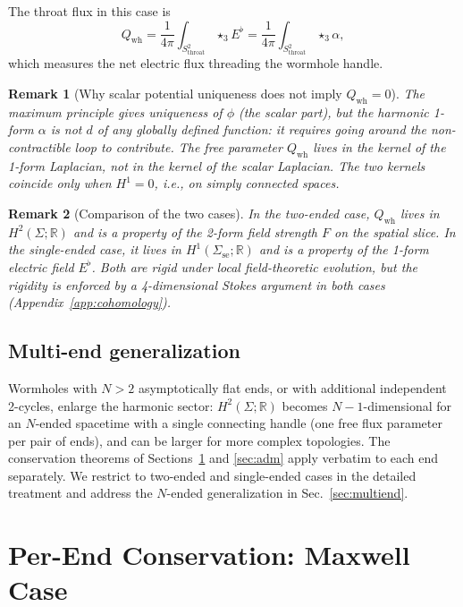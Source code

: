 \documentclass[aps,prd,onecolumn,nofootinbib,superscriptaddress]{revtex4-2}
\newtheorem{remark}{Remark}
\begin{document}
The throat flux in this case is
\begin{equation}
  Q_{\mathrm{wh}} = \frac{1}{4\pi}\int_{S^2_{\mathrm{throat}}}\star_3 E^\flat
  = \frac{1}{4\pi}\int_{S^2_{\mathrm{throat}}}\star_3\alpha,
\end{equation}
which measures the net electric flux threading the wormhole handle.

\begin{remark}[Why scalar potential uniqueness does not imply $Q_{\mathrm{wh}}=0$]
The maximum principle gives uniqueness of $\phi$ (the scalar part), but the
harmonic 1-form $\alpha$ is not $d$ of any globally defined function: it
requires going around the non-contractible loop to contribute.  The free
parameter $Q_{\mathrm{wh}}$ lives in the kernel of the 1-form Laplacian, not
in the kernel of the scalar Laplacian.  The two kernels coincide only when
$H^1=0$, i.e., on simply connected spaces.
\end{remark}

\begin{remark}[Comparison of the two cases]
In the two-ended case, $Q_{\mathrm{wh}}$ lives in $H^2(\Sigma;\mathbb{R})$ and
is a property of the 2-form field strength $F$ on the spatial slice.  In the
single-ended case, it lives in $H^1(\Sigma_{\mathrm{se}};\mathbb{R})$ and is a
property of the 1-form electric field $E^\flat$.  Both are rigid under local
field-theoretic evolution, but the rigidity is enforced by a 4-dimensional
Stokes argument in both cases (Appendix~\ref{app:cohomology}).
\end{remark}

\subsection{Multi-end generalization}

Wormholes with $N>2$ asymptotically flat ends, or with additional independent
2-cycles, enlarge the harmonic sector: $H^2(\Sigma;\mathbb{R})$ becomes
$N-1$-dimensional for an $N$-ended spacetime with a single connecting handle
(one free flux parameter per pair of ends), and can be larger for more complex
topologies.  The conservation theorems of Sections~\ref{sec:maxwell} and
\ref{sec:adm} apply verbatim to each end separately.  We restrict to two-ended
and single-ended cases in the detailed treatment and address the $N$-ended
generalization in Sec.~\ref{sec:multiend}.

\section{Per-End Conservation: Maxwell Case}
\label{sec:maxwell}
\end{document}
